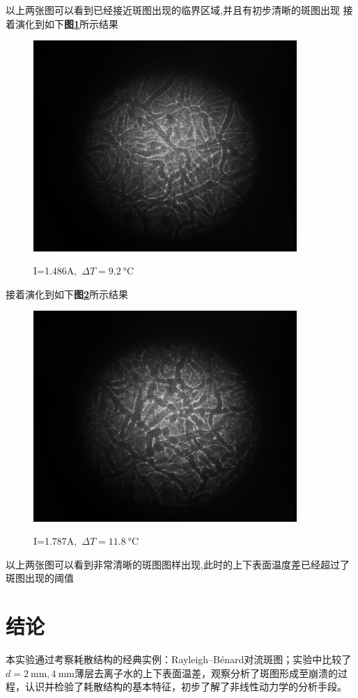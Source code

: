 \documentclass[a4paper]{article}
\begin{document}
以上两张图可以看到已经接近斑图出现的临界区域,并且有初步清晰的斑图出现
\newpage
接着演化到如下\textbf{图\ref{result:fig15}}所示结果
\begin{figure}[H]
 \centering
 \caption{I=1.486A,\ $\Delta T=\SI{9.2}{\celsius}$}
 \includegraphics[height=8cm, width=10cm]{images/43.0_52.2_1.486_6.40.bmp}
 \label{result:fig15}
\end{figure}
接着演化到如下\textbf{图\ref{result:fig16}}所示结果
\begin{figure}[H]
 \centering
 \caption{I=1.787A,\ $\Delta T=\SI{11.8}{\celsius}$}
 \includegraphics[height=8cm, width=10cm]{images/48.0_59.8_1.787_6.47.bmp}
 \label{result:fig16}
\end{figure}
以上两张图可以看到非常清晰的斑图图样出现,此时的上下表面温度差已经超过了斑图出现的阈值
\newpage
\section{结论}\label{conclusions}
本实验通过考察耗散结构的经典实例：Rayleigh–Bénard对流斑图；实验中比较了$d = \SI{2}{\mm},\SI{4}{\mm}$薄层去离子水的上下表面温差，观察分析了斑图形成至崩溃的过程，认识并检验了耗散结构的基本特征，初步了解了非线性动力学的分析手段。
\end{document}
